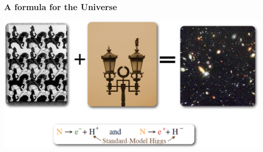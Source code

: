 \begin{frame}
\frametitle{A formula for the Universe}
\includegraphics[scale=0.30]{img/formulaUniverse.png}
\end{frame}










